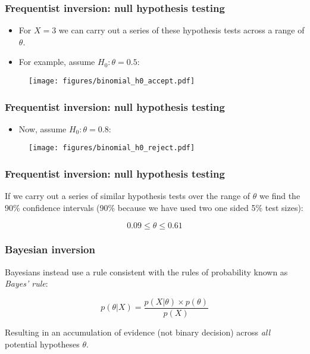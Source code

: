 \documentclass{beamer}
\begin{document}
\begin{frame}
	\frametitle{Frequentist inversion: null hypothesis testing}
	
	\begin{itemize}
		\item<2-> For $X=3$ we can carry out a series of these hypothesis tests across a range of $\theta$.
		\item<3-> For example, assume $H_0: \theta=0.5$:
	\end{itemize}
	
	\begin{figure}[ht]
		\centerline{\texttt{[image: figures/binomial\_h0\_accept.pdf]}}
	\end{figure}
	
\end{frame}

\begin{frame}
	\frametitle{Frequentist inversion: null hypothesis testing}
	
	\begin{itemize}
		\item<3-> Now, assume $H_0: \theta=0.8$:
	\end{itemize}
	
	\begin{figure}[ht]
		\centerline{\texttt{[image: figures/binomial\_h0\_reject.pdf]}}
	\end{figure}
	
\end{frame}

\begin{frame}
	\frametitle{Frequentist inversion: null hypothesis testing}
		If we carry out a series of similar hypothesis tests over the range of $\theta$ we find the 90\% confidence intervals (90\% because we have used two one sided 5\% test sizes):
		 
			\begin{equation}
			0.09 \leq \theta \leq 0.61
			\end{equation}
	
\end{frame}

\begin{frame}
	\frametitle{Bayesian inversion}
	Bayesians instead use a rule consistent with the rules of probability known as \textit{Bayes' rule}:
	
	\begin{equation}
	p(\theta|X) = \frac{p(X|\theta)\times p(\theta)}{p(X)}
	\end{equation}
	
	Resulting in an accumulation of evidence (not binary decision) across \textit{all} potential hypotheses $\theta$.
	
\end{frame}
\end{document}
